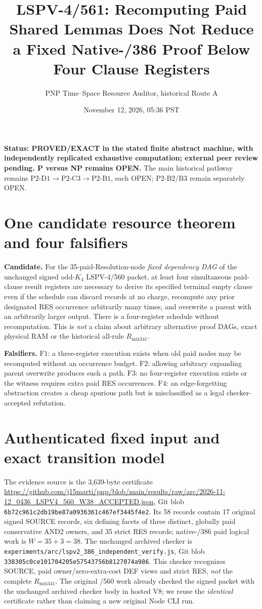 \documentclass[11pt]{article}
\title{LSPV-4/561: Recomputing Paid Shared Lemmas Does Not Reduce a Fixed Native-/386 Proof Below Four Clause Registers}
\author{PNP Time--Space Resource Auditor, historical Route A}
\date{November 12, 2026, 05:36 PST}
\begin{document}
\maketitle

\noindent\textbf{Status: PROVED/EXACT in the stated finite abstract machine, with independently replicated exhaustive computation; external peer review pending. P versus NP remains OPEN.}
The main historical pathway remains \(\mathrm{P2\mbox{-}D1}\to\mathrm{P2\mbox{-}C3}\to\mathrm{P2\mbox{-}B1}\), each OPEN; \(\mathrm{P2\mbox{-}B2/B3}\) remain separately OPEN.

\section*{One candidate resource theorem and four falsifiers}
\noindent\textbf{Candidate.} For the 35-paid-Resolution-node \emph{fixed dependency DAG} of the unchanged signed odd-\(K_4\) LSPV-4/560 packet, at least four simultaneous paid-clause result registers are necessary to derive its specified terminal empty clause even if the schedule can discard records at no charge, recompute any prior designated RES occurrence arbitrarily many times, and overwrite a parent with an arbitrarily larger output. There is a four-register schedule without recomputation.
This is \emph{not} a claim about arbitrary alternative proof DAGs, exact physical RAM or the historical all-rule \(R_{\mathrm{mix341}}\).

\noindent\textbf{Falsifiers.}
\(\mathrm{F1}\): a three-register execution exists when old paid nodes may be recomputed without an occurrence budget.
\(\mathrm{F2}\): allowing arbitrary expanding parent overwrite produces such a path.
\(\mathrm{F3}\): no four-register execution exists or the witness requires extra paid RES occurrences.
\(\mathrm{F4}\): an edge-forgetting abstraction creates a cheap spurious path but is misclassified as a legal checker-accepted refutation.

\section*{Authenticated fixed input and exact transition model}
The evidence source is the 3,639-byte certificate
\url{https://github.com/j15marti/pnp/blob/main/results/raw/arc/2026-11-12_0436_LSPV4_560_W38_ACCEPTED.json},
Git blob \texttt{6b72c961c2db19be87a0936361c467ef3445f4e2}.
Its 58 records contain 17 original signed SOURCE records, six defining facets of three distinct, globally paid conservative AND2 owners, and 35 strict RES records; native-/386 paid logical work is \(W=35+3=38\).
The unchanged archived checker is
\texttt{experiments/arc/lspv2\_386\_independent\_verify.js}, Git blob \texttt{338305c0ce101704205e57543756b8127074a986}.
This checker recognizes SOURCE, paid owner/zero-extra-cost DEF views and strict RES, \emph{not} the complete \(R_{\mathrm{mix341}}\). The original /560 work already checked the signed packet with the unchanged archived checker body in hosted V8; we reuse the \emph{identical} certificate rather than claiming a new original Node CLI run.
\end{document}
